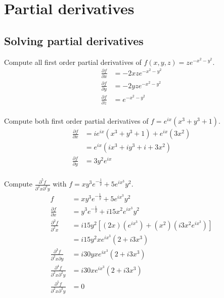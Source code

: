 \section{Partial derivatives}

  \subsection{Solving partial derivatives}
  Compute all first order partial derivatives of $f(x, y, z) = ze^{-x^2-y^2}$.
  \begin{align*}
    \frac{\partial f}{\partial x} & = -2xze^{-x^2-y^2} \\
    \frac{\partial f}{\partial y} & = -2yze^{-x^2-y^2} \\
    \frac{\partial f}{\partial z} & = e^{-x^2-y^2}\\
  \end{align*}

  Compute both first order partial derivatives of $f = e^{ix}(x^3 + y^3 + 1)$.
  \begin{align*}
    \frac{\partial f}{\partial x} & = ie^{ix}(x^3 + y^3 + 1) + e^{ix}(3x^2) \\
                                  & = e^{ix}(ix^3 + iy^3 + i + 3x^2) \\
    \frac{\partial f}{\partial y} & = 3y^2e^{ix} \\
  \end{align*}

  Compute $\frac{\partial^5f}{\partial^2x\partial^3y}$ with $f = xy^3e^{-\frac{1}{y}} + 5e^{ix^3}y^2$.
  \begin{align*}
    f                                           & = xy^3e^{-\frac{1}{y}} + 5e^{ix^3}y^2 \\
    \frac{\partial f}{\partial x}               & = y^3e^{-\frac{1}{y}} + i15x^2e^{ix^3}y^2\\
    \frac{\partial^2f}{\partial^2x}             & = i15y^2[(2x)(e^{ix^3}) + (x^2)(i3x^2e^{ix^3})]\\
                                                & = i15y^2xe^{ix^3}(2 + i3x^3)\\
    \frac{\partial^3f}{\partial^2x\partial y}   & = i30yxe^{ix^3}(2 + i3x^3) \\
    \frac{\partial^4f}{\partial^2x\partial^2y}  & = i30xe^{ix^3}(2 + i3x^3) \\
    \frac{\partial^5f}{\partial^2x\partial^3y}  & = 0 \\
  \end{align*}

